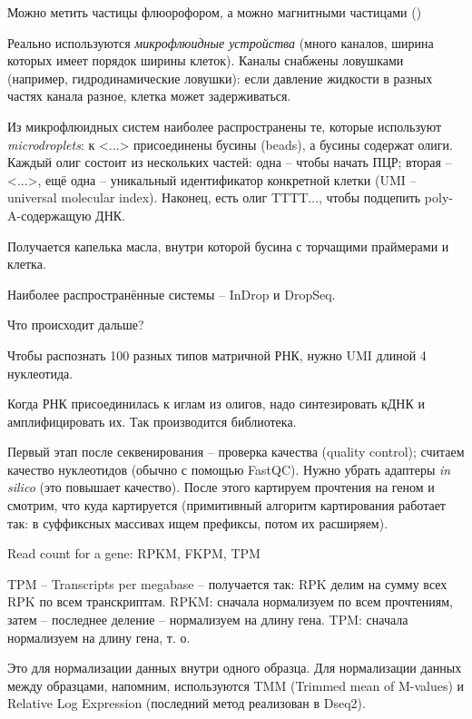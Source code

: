 \documentclass[main.tex]{subfiles}
\begin{document}

Можно метить частицы флюорофором, а можно магнитными частицами ()

Реально используются \emph{микрофлюидные устройства} (много каналов, ширина которых имеет порядок ширины клеток).
Каналы снабжены ловушками (например, гидродинамические ловушки): если давление жидкости в разных частях канала разное, клетка может задерживаться.

Из микрофлюидных систем наиболее распространены те, которые используют  \emph{microdroplets}:
к <...> присоединены бусины (beads), а бусины содержат олиги.
Каждый олиг состоит из нескольких частей: одна -- чтобы начать ПЦР; вторая -- <...>, ещё одна -- уникальный идентификатор конкретной клетки (UMI -- universal molecular index).
Наконец, есть олиг TTTT..., чтобы подцепить poly-A-содержащую ДНК. %

Получается капелька масла, внутри которой бусина с торчащими праймерами и клетка.

Наиболее распространённые системы -- InDrop и DropSeq.

Что происходит дальше?


Чтобы распознать 100 разных типов матричной РНК, нужно UMI длиной 4 нуклеотида.

Когда РНК присоединилась к иглам из олигов, надо синтезировать кДНК и амплифицировать их.
Так производится библиотека.

Первый этап после секвенирования -- проверка качества (quality control); считаем качество нуклеотидов (обычно с помощью FastQC).
Нужно убрать адаптеры \textit{in silico} (это повышает качество).
После этого картируем прочтения на геном и смотрим, что куда картируется (примитивный алгоритм картирования работает так: в суффиксных массивах ищем префиксы, потом их расширяем).


Read count for a gene: RPKM, FKPM, TPM

TPM -- Transcripts per megabase -- получается так: RPK делим на сумму всех RPK по всем транскриптам.
RPKM: сначала нормализуем по всем прочтениям, затем -- последнее деление -- нормализуем на длину гена.
TPM: сначала нормализуем на длину гена, т. о. %

Это для нормализации данных внутри одного образца.
Для нормализации данных между образцами, напомним, используются TMM (Trimmed mean of M-values) и Relative Log Expression (последний метод реализован в Dseq2).
\end{document}
